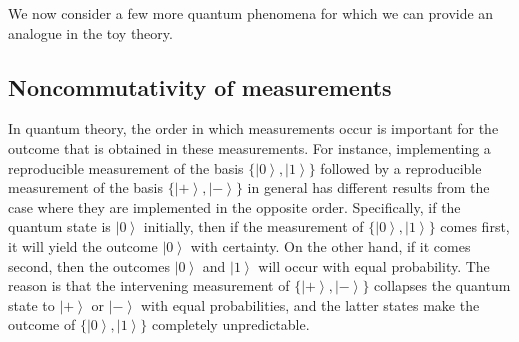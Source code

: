 \documentclass[pra,twocolumn,nofootinbib,showpacs]{revtex4}
\begin{document}
We now consider a few more quantum phenomena for which we can provide an
analogue in the toy theory.

\subsection{Noncommutativity of measurements}

\label{non-commutativity}

In quantum theory, the order in which measurements occur is important for
the outcome that is obtained in these measurements. For instance,
implementing a reproducible measurement of the basis $\{\left|
0\right\rangle ,\left| 1\right\rangle \}$ followed by a reproducible
measurement of the basis $\{\left| +\right\rangle ,\left| -\right\rangle \}$
in general has different results from the case where they are implemented in
the opposite order. Specifically, if the quantum state is $\left|
0\right\rangle $ initially, then if the measurement of $\{\left|
0\right\rangle ,\left| 1\right\rangle \}$ comes first, it will yield the
outcome $\left| 0\right\rangle $ with certainty. On the other hand, if it
comes second, then the outcomes $\left| 0\right\rangle $ and $\left|
1\right\rangle $ will occur with equal probability. The reason is that the
intervening measurement of $\{\left| +\right\rangle ,\left| -\right\rangle
\} $ collapses the quantum state to $\left| +\right\rangle $ or $\left|
-\right\rangle $ with equal probabilities, and the latter states make the
outcome of $\{\left| 0\right\rangle ,\left| 1\right\rangle \}$ completely
unpredictable.
\end{document}
